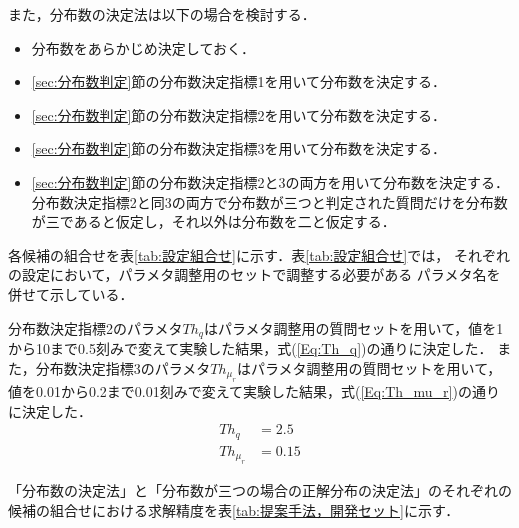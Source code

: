 \documentclass[japanese]{jnlp_1.4}
\begin{document}
また，分布数の決定法は以下の場合を検討する．
\begin{itemize}
\item 分布数をあらかじめ決定しておく．
\item \ref{sec:分布数判定}節の分布数決定指標1を用いて分布数を決定する．
\item \ref{sec:分布数判定}節の分布数決定指標2を用いて分布数を決定する．
\item \ref{sec:分布数判定}節の分布数決定指標3を用いて分布数を決定する．
\item \ref{sec:分布数判定}節の分布数決定指標2と3の両方を用いて分布数を決定する．分布数決定指標2と同3の両方で分布数が三つと判定された質問だけを分布数が三であると仮定し，それ以外は分布数を二と仮定する．
\end{itemize}

各候補の組合せを表\ref{tab:設定組合せ}に示す．表\ref{tab:設定組合せ}では，
それぞれの設定において，パラメタ調整用のセットで調整する必要がある
パラメタ名を併せて示している．

\begin{table}[b]
\label{tab:設定組合せ}
\begin{center}

\end{center}
\end{table}


分布数決定指標2のパラメタ$Th_q$はパラメタ調整用の質問セットを用いて，値を1から10まで0.5刻みで変えて実験した結果，式(\ref{Eq:Th_q})の通りに決定した．
また，分布数決定指標3のパラメタ$Th_{\mu_r}$はパラメタ調整用の質問セットを用いて，値を0.01から0.2まで0.01刻みで変えて実験した結果，式(\ref{Eq:Th_mu_r})の通りに決定した．
\begin{align} 
Th_q & = 2.5 \label{Eq:Th_q}\\
Th_{\mu_r} & = 0.15 \label{Eq:Th_mu_r}
\end{align}

「分布数の決定法」と「分布数が三つの場合の正解分布の決定法」のそれぞれの候補の組合せにおける求解精度を表\ref{tab:提案手法，開発セット}に示す．

\begin{table}[b]
\label{tab:提案手法，開発セット}
\begin{center}

\end{center}
\end{table}
\end{document}
